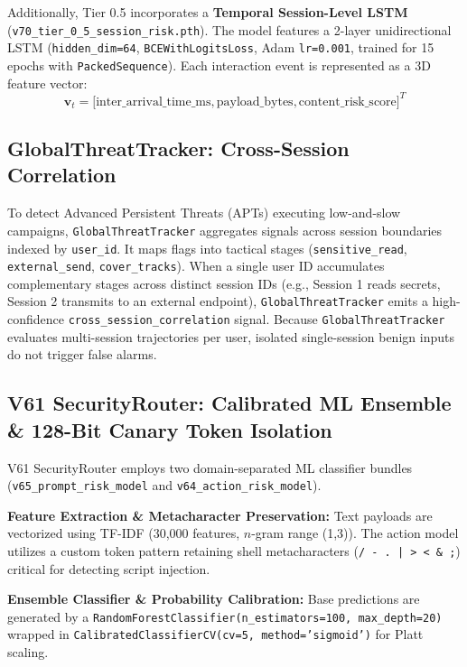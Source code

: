 \documentclass[conference]{IEEEtran}
\begin{document}
Additionally, Tier 0.5 incorporates a \textbf{Temporal Session-Level LSTM} (\texttt{v70\_tier\_0\_5\_session\_risk.pth}). The model features a 2-layer unidirectional LSTM (\texttt{hidden\_dim=64}, \texttt{BCEWithLogitsLoss}, Adam \texttt{lr=0.001}, trained for 15 epochs with \texttt{PackedSequence}). Each interaction event is represented as a 3D feature vector:
\begin{equation}
\mathbf{v}_t = \big[\text{inter\_arrival\_time\_ms}, \text{payload\_bytes}, \text{content\_risk\_score}\big]^T
\end{equation}

\subsection{GlobalThreatTracker: Cross-Session Correlation}
To detect Advanced Persistent Threats (APTs) executing low-and-slow campaigns, \texttt{GlobalThreatTracker} aggregates signals across session boundaries indexed by \texttt{user\_id}. It maps flags into tactical stages (\texttt{sensitive\_read}, \texttt{external\_send}, \texttt{cover\_tracks}). When a single user ID accumulates complementary stages across distinct session IDs (e.g., Session 1 reads secrets, Session 2 transmits to an external endpoint), \texttt{GlobalThreatTracker} emits a high-confidence \texttt{cross\_session\_correlation} signal. Because \texttt{GlobalThreatTracker} evaluates multi-session trajectories per user, isolated single-session benign inputs do not trigger false alarms.

\subsection{V61 SecurityRouter: Calibrated ML Ensemble \& 128-Bit Canary Token Isolation}
V61 SecurityRouter employs two domain-separated ML classifier bundles (\texttt{v65\_prompt\_risk\_model} and \texttt{v64\_action\_risk\_model}).

\textbf{Feature Extraction \& Metacharacter Preservation:} Text payloads are vectorized using TF-IDF (30,000 features, $n$-gram range (1,3)). The action model utilizes a custom token pattern retaining shell metacharacters (\texttt{/ - . | > < \& ;}) critical for detecting script injection.

\textbf{Ensemble Classifier \& Probability Calibration:} Base predictions are generated by a \texttt{RandomForestClassifier(n\_estimators=100, max\_depth=20)} wrapped in \texttt{CalibratedClassifierCV(cv=5, method='sigmoid')} for Platt scaling.
\end{document}
